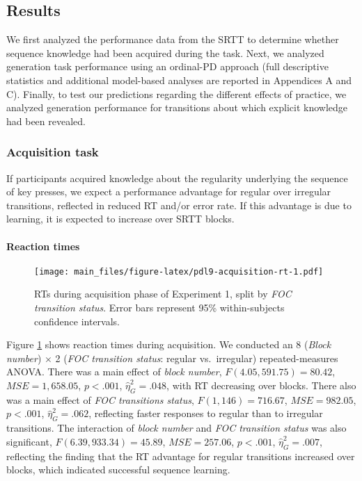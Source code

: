 \documentclass[floatsintext,doc]{apa6}
\theoremstyle{definition}
\theoremstyle{definition}
\theoremstyle{definition}
\theoremstyle{remark}
\begin{document}
\subsection{Results}\label{results}

We first analyzed the performance data from the SRTT to determine
whether sequence knowledge had been acquired during the task. Next, we
analyzed generation task performance using an ordinal-PD approach (full
descriptive statistics and additional model-based analyses are reported
in Appendices A and C). Finally, to test our predictions regarding the
different effects of practice, we analyzed generation performance for
transitions about which explicit knowledge had been revealed.

\subsubsection{Acquisition task}\label{acquisition-task}

If participants acquired knowledge about the regularity underlying the
sequence of key presses, we expect a performance advantage for regular
over irregular transitions, reflected in reduced RT and/or error rate.
If this advantage is due to learning, it is expected to increase over
SRTT blocks.

\paragraph{Reaction times}\label{reaction-times}

\begin{figure}
\centering
\texttt{[image: main\_files/figure-latex/pdl9-acquisition-rt-1.pdf]}
\caption{\label{fig:pdl9-acquisition-rt}RTs during acquisition phase of
Experiment 1, split by \emph{FOC transition status}. Error bars
represent 95\% within-subjects confidence intervals.}
\end{figure}

Figure \ref{fig:pdl9-acquisition-rt} shows reaction times during
acquisition. We conducted an 8 (\emph{Block number}) \(\times\) 2
(\emph{FOC transition status}: regular vs.~irregular) repeated-measures
ANOVA. There was a main effect of \emph{block number},
\(F(4.05, 591.75) = 80.42\), \(\mathit{MSE} = 1,658.05\), \(p < .001\),
\(\hat{\eta}^2_G = .048\), with RT decreasing over blocks. There also
was a main effect of \emph{FOC transitions status},
\(F(1, 146) = 716.67\), \(\mathit{MSE} = 982.05\), \(p < .001\),
\(\hat{\eta}^2_G = .062\), reflecting faster responses to regular than
to irregular transitions. The interaction of \emph{block number} and
\emph{FOC transition status} was also significant,
\(F(6.39, 933.34) = 45.89\), \(\mathit{MSE} = 257.06\), \(p < .001\),
\(\hat{\eta}^2_G = .007\), reflecting the finding that the RT advantage
for regular transitions increased over blocks, which indicated
successful sequence learning.
\end{document}

